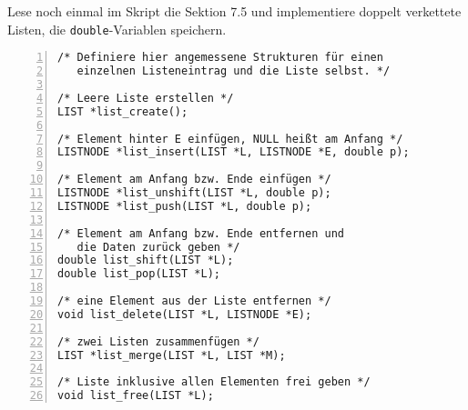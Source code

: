 \documentclass{uebungszettel}
\begin{document}
\begin{aufg} Lese noch einmal im Skript die Sektion 7.5 und implementiere doppelt verkettete Listen, die \verb|double|-Variablen speichern.

\medskip\begin{codelisting}
\begin{lstlisting}[numbers=left,numberstyle=\tiny,frame=tlrb]
/* Definiere hier angemessene Strukturen für einen
   einzelnen Listeneintrag und die Liste selbst. */

/* Leere Liste erstellen */
LIST *list_create();

/* Element hinter E einfügen, NULL heißt am Anfang */
LISTNODE *list_insert(LIST *L, LISTNODE *E, double p);

/* Element am Anfang bzw. Ende einfügen */
LISTNODE *list_unshift(LIST *L, double p);
LISTNODE *list_push(LIST *L, double p);

/* Element am Anfang bzw. Ende entfernen und 
   die Daten zurück geben */
double list_shift(LIST *L);
double list_pop(LIST *L);

/* eine Element aus der Liste entfernen */
void list_delete(LIST *L, LISTNODE *E);

/* zwei Listen zusammenfügen */
LIST *list_merge(LIST *L, LIST *M);

/* Liste inklusive allen Elementen frei geben */
void list_free(LIST *L);

\end{lstlisting}
\end{codelisting}
\end{aufg}
\end{document}
